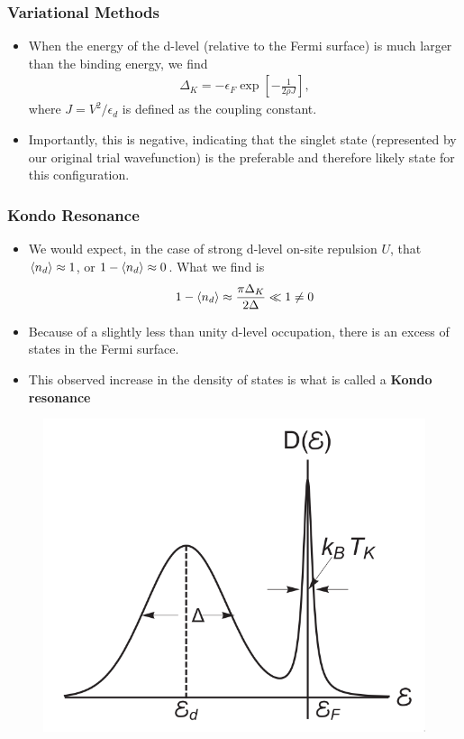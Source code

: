 \documentclass{beamer}
\begin{document}
\begin{frame}
  \frametitle{Variational Methods}

  \begin{itemize}
  \item When the energy of the d-level (relative to the Fermi surface) is much larger than the binding energy, we find
    \begin{gather*}
      \Delta_K = -\epsilon_F \exp\left[ -\frac{1}{2\rho J} \right],
    \end{gather*}
    where $J = V^2/\epsilon_d$ is defined as the coupling constant.
  \item Importantly, this is negative, indicating that the singlet state (represented by our original trial wavefunction) is the preferable and therefore likely state for this configuration.
  \end{itemize}
\end{frame}

\begin{frame}
  \frametitle{Kondo Resonance}

  \begin{itemize}
  \item We would expect, in the case of strong d-level on-site repulsion $U$, that $\braket{n_d} \approx 1$, or $1 - \braket{n_d} \approx 0$. What we find is
    \begin{gather*}
      1 - \braket{n_d} \approx \frac{\pi \Delta_K}{2\Delta} \ll 1 \neq 0
    \end{gather*}
  \item Because of a slightly less than unity d-level occupation, there is an excess of states in the Fermi surface.
  \item This observed increase in the density of states is what is called a \textbf{Kondo resonance}
  \end{itemize}

  \begin{figure}
    \centering
    \includegraphics[width=0.4\linewidth]{./gfx/kondo-resonance.png}
  \end{figure}
\end{frame}
\end{document}
